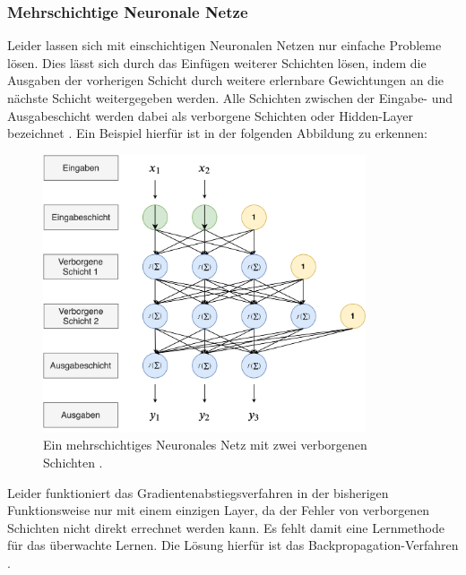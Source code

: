 \documentclass[11pt,bibliography=totocnumbered]{scrartcl}
\begin{document}
\subsubsection{Mehrschichtige Neuronale Netze}
Leider lassen sich mit einschichtigen Neuronalen Netzen nur einfache Probleme lösen. Dies lässt sich durch das Einfügen weiterer Schichten lösen, indem die Ausgaben der vorherigen Schicht durch weitere erlernbare Gewichtungen an die nächste Schicht weitergegeben werden. Alle Schichten zwischen der Eingabe- und Ausgabeschicht werden dabei als verborgene Schichten oder Hidden-Layer bezeichnet \cite[S.31-32]{BA}\cite[S.261]{MACHINE_LEARNING}. Ein Beispiel hierfür ist in der folgenden Abbildung zu erkennen: 
\begin{figure}[H]
	\centering
	\includegraphics[width=0.85\textwidth]{multi_layer_perceptron}
	\vspace*{-3mm}
	\caption[Mehrschichtiges Neuronales Netz]{Ein mehrschichtiges Neuronales Netz mit zwei verborgenen Schichten \cite[S.32]{BA}\cite[S.261]{MACHINE_LEARNING}.}
	\label{fig:mutlilayer_nn}
\end{figure}
\vspace*{-5mm}
Leider funktioniert das Gradientenabstiegsverfahren in der bisherigen Funktionsweise nur mit einem einzigen Layer, da der Fehler von verborgenen Schichten nicht direkt errechnet werden kann. Es fehlt damit eine Lernmethode für das überwachte Lernen. Die Lösung hierfür ist das Backpropagation-Verfahren \cite[S.261]{MACHINE_LEARNING}. 
\end{document}
